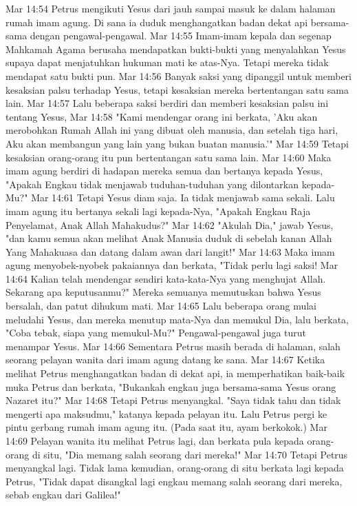 Mar 14:54  Petrus mengikuti Yesus dari jauh sampai masuk ke dalam halaman rumah imam agung. Di sana ia duduk menghangatkan badan dekat api bersama-sama dengan pengawal-pengawal.
Mar 14:55  Imam-imam kepala dan segenap Mahkamah Agama berusaha mendapatkan bukti-bukti yang menyalahkan Yesus supaya dapat menjatuhkan hukuman mati ke atas-Nya. Tetapi mereka tidak mendapat satu bukti pun.
Mar 14:56  Banyak saksi yang dipanggil untuk memberi kesaksian palsu terhadap Yesus, tetapi kesaksian mereka bertentangan satu sama lain.
Mar 14:57  Lalu beberapa saksi berdiri dan memberi kesaksian palsu ini tentang Yesus,
Mar 14:58  "Kami mendengar orang ini berkata, 'Aku akan merobohkan Rumah Allah ini yang dibuat oleh manusia, dan setelah tiga hari, Aku akan membangun yang lain yang bukan buatan manusia.'"
Mar 14:59  Tetapi kesaksian orang-orang itu pun bertentangan satu sama lain.
Mar 14:60  Maka imam agung berdiri di hadapan mereka semua dan bertanya kepada Yesus, "Apakah Engkau tidak menjawab tuduhan-tuduhan yang dilontarkan kepada-Mu?"
Mar 14:61  Tetapi Yesus diam saja. Ia tidak menjawab sama sekali. Lalu imam agung itu bertanya sekali lagi kepada-Nya, "Apakah Engkau Raja Penyelamat, Anak Allah Mahakudus?"
Mar 14:62  "Akulah Dia," jawab Yesus, "dan kamu semua akan melihat Anak Manusia duduk di sebelah kanan Allah Yang Mahakuasa dan datang dalam awan dari langit!"
Mar 14:63  Maka imam agung menyobek-nyobek pakaiannya dan berkata, "Tidak perlu lagi saksi!
Mar 14:64  Kalian telah mendengar sendiri kata-kata-Nya yang menghujat Allah. Sekarang apa keputusanmu?" Mereka semuanya memutuskan bahwa Yesus bersalah, dan patut dihukum mati.
Mar 14:65  Lalu beberapa orang mulai meludahi Yesus, dan mereka menutup mata-Nya dan memukul Dia, lalu berkata, "Coba tebak, siapa yang memukul-Mu?" Pengawal-pengawal juga turut menampar Yesus.
Mar 14:66  Sementara Petrus masih berada di halaman, salah seorang pelayan wanita dari imam agung datang ke sana.
Mar 14:67  Ketika melihat Petrus menghangatkan badan di dekat api, ia memperhatikan baik-baik muka Petrus dan berkata, "Bukankah engkau juga bersama-sama Yesus orang Nazaret itu?"
Mar 14:68  Tetapi Petrus menyangkal. "Saya tidak tahu dan tidak mengerti apa maksudmu," katanya kepada pelayan itu. Lalu Petrus pergi ke pintu gerbang rumah imam agung itu. (Pada saat itu, ayam berkokok.)
Mar 14:69  Pelayan wanita itu melihat Petrus lagi, dan berkata pula kepada orang-orang di situ, "Dia memang salah seorang dari mereka!"
Mar 14:70  Tetapi Petrus menyangkal lagi. Tidak lama kemudian, orang-orang di situ berkata lagi kepada Petrus, "Tidak dapat disangkal lagi engkau memang salah seorang dari mereka, sebab engkau dari Galilea!"
